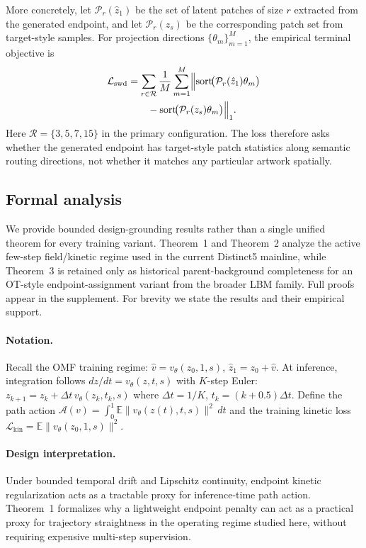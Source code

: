 \documentclass[letterpaper]{article}
\begin{document}
More concretely, let $\mathcal{P}_r(\hat{z}_1)$ be the set of latent patches of size $r$ extracted from the generated endpoint, and let $\mathcal{P}_r(z_s)$ be the corresponding patch set from target-style samples. For projection directions $\{\theta_m\}_{m=1}^M$, the empirical terminal objective is
\begin{align}
    \mathcal{L}_{\mathrm{swd}} &=
    \sum_{r\in\mathcal{R}} \frac{1}{M} \sum_{m=1}^{M}
    \Bigl\|
    \operatorname{sort}\!\bigl(\mathcal{P}_r(\hat{z}_1)\theta_m\bigr) \notag \\
    &\qquad - \operatorname{sort}\!\bigl(\mathcal{P}_r(z_s)\theta_m\bigr)
    \Bigr\|_1 .
\end{align}
Here $\mathcal{R}=\{3,5,7,15\}$ in the primary configuration. The loss therefore asks whether the generated endpoint has target-style patch statistics along semantic routing directions, not whether it matches any particular artwork spatially.

\subsection{Formal analysis}
\label{sec:formal}
We provide bounded design-grounding results rather than a single
unified theorem for every training variant. Theorem~1 and
Theorem~2 analyze the active few-step field/kinetic regime used in
the current Distinct5 mainline, while Theorem~3 is retained only as
historical parent-background completeness for an OT-style
endpoint-assignment variant from the broader LBM family. Full proofs
appear in the supplement.
For brevity we state the results and their empirical support.

\paragraph{Notation.}
Recall the OMF training regime: $\hat v = v_\theta(z_0,1,s)$,
$\hat z_1 = z_0 + \hat v$.
At inference, integration follows $dz/dt=v_\theta(z,t,s)$ with
$K$-step Euler: $z_{k+1}=z_k+\Delta t\,v_\theta(z_k,t_k,s)$
where $\Delta t=1/K$, $t_k=(k+0.5)\Delta t$.
Define the path action
$\mathcal{A}(v)=\int_0^1\mathbb{E}\|v_\theta(z(t),t,s)\|^2\,dt$
and the training kinetic loss
$\mathcal{L}_{\mathrm{kin}}=\mathbb{E}\|v_\theta(z_0,1,s)\|^2$.

\paragraph{Design interpretation.}
Under bounded temporal drift and Lipschitz continuity, endpoint kinetic regularization acts as a tractable proxy for inference-time path action. Theorem~1 formalizes why a lightweight endpoint penalty can act as a practical proxy for trajectory straightness in the operating regime studied here, without requiring expensive multi-step supervision.
\end{document}
